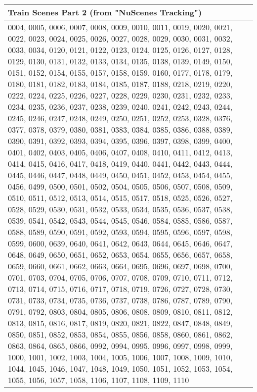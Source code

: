 \begin{center}
	\begin{tabular}{m{14.0cm}}
		Train Scenes Part 2 (from "NuScenes Tracking")\\
		\hline
		0004, 0005, 0006, 0007, 0008, 0009, 0010, 0011,
		0019, 0020, 0021, 0022, 0023, 0024, 0025, 0026,
		0027, 0028, 0029, 0030, 0031, 0032, 0033, 0034,
		0120, 0121, 0122, 0123, 0124, 0125, 0126, 0127,
		0128, 0129, 0130, 0131, 0132, 0133, 0134, 0135,
		0138, 0139, 0149, 0150, 0151, 0152, 0154, 0155,
		0157, 0158, 0159, 0160, 0177, 0178, 0179, 0180,
		0181, 0182, 0183, 0184, 0185, 0187, 0188, 0218,
		0219, 0220, 0222, 0224, 0225, 0226, 0227, 0228,
		0229, 0230, 0231, 0232, 0233, 0234, 0235, 0236,
		0237, 0238, 0239, 0240, 0241, 0242, 0243, 0244,
		0245, 0246, 0247, 0248, 0249, 0250, 0251, 0252,
		0253, 0328, 0376, 0377, 0378, 0379, 0380, 0381,
		0383, 0384, 0385, 0386, 0388, 0389, 0390, 0391,
		0392, 0393, 0394, 0395, 0396, 0397, 0398, 0399,
		0400, 0401, 0402, 0403, 0405, 0406, 0407, 0408,
		0410, 0411, 0412, 0413, 0414, 0415, 0416, 0417,
		0418, 0419, 0440, 0441, 0442, 0443, 0444, 0445,
		0446, 0447, 0448, 0449, 0450, 0451, 0452, 0453,
		0454, 0455, 0456, 0499, 0500, 0501, 0502, 0504,
		0505, 0506, 0507, 0508, 0509, 0510, 0511, 0512,
		0513, 0514, 0515, 0517, 0518, 0525, 0526, 0527,
		0528, 0529, 0530, 0531, 0532, 0533, 0534, 0535,
		0536, 0537, 0538, 0539, 0541, 0542, 0543, 0544,
		0545, 0546, 0584, 0585, 0586, 0587, 0588, 0589,
		0590, 0591, 0592, 0593, 0594, 0595, 0596, 0597,
		0598, 0599, 0600, 0639, 0640, 0641, 0642, 0643,
		0644, 0645, 0646, 0647, 0648, 0649, 0650, 0651,
		0652, 0653, 0654, 0655, 0656, 0657, 0658, 0659,
		0660, 0661, 0662, 0663, 0664, 0695, 0696, 0697,
		0698, 0700, 0701, 0703, 0704, 0705, 0706, 0707,
		0708, 0709, 0710, 0711, 0712, 0713, 0714, 0715,
		0716, 0717, 0718, 0719, 0726, 0727, 0728, 0730,
		0731, 0733, 0734, 0735, 0736, 0737, 0738, 0786,
		0787, 0789, 0790, 0791, 0792, 0803, 0804, 0805,
		0806, 0808, 0809, 0810, 0811, 0812, 0813, 0815,
		0816, 0817, 0819, 0820, 0821, 0822, 0847, 0848,
		0849, 0850, 0851, 0852, 0853, 0854, 0855, 0856,
		0858, 0860, 0861, 0862, 0863, 0864, 0865, 0866,
		0992, 0994, 0995, 0996, 0997, 0998, 0999, 1000,
		1001, 1002, 1003, 1004, 1005, 1006, 1007, 1008,
		1009, 1010, 1044, 1045, 1046, 1047, 1048, 1049,
		1050, 1051, 1052, 1053, 1054, 1055, 1056, 1057,
		1058, 1106, 1107, 1108, 1109, 1110
	\end{tabular}
\end{center}
